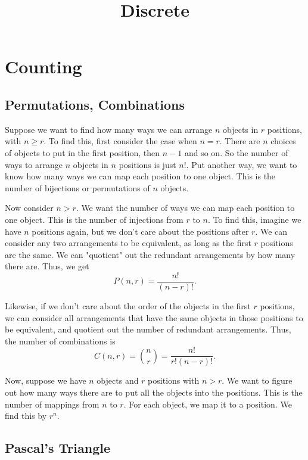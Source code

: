 \documentclass[../main.tex]{subfiles}
\title{Discrete}
\author{}
\date{}
\begin{document}
\maketitle
\tableofcontents

\newpage

\section{Counting}

\subsection{Permutations, Combinations}

Suppose we want to find how many ways we can arrange
\( n \) objects in \( r \) positions, with \( n \geq r \).
To find this, first consider the case when \( n = r \).
There are \( n \) choices of objects to put in the first position, then \( n - 1 \) and so on.
So the number of ways to arrange \( n \) objects in \( n \) positions is just \( n! \).
Put another way,
we want to know how many ways we can map each position to one object.
This is the number of bijections or permutations of \( n \) objects.

\noindent


Now consider \( n > r \).
We want the number of ways we can map each position to one object.
This is the number of injections from \( r \) to \( n \).
To find this, imagine we have \( n \) positions again,
but we don't care about the positions after \( r \).
We can consider any two arrangements to be equivalent,
as long as the first \( r \) positions are the same.
We can "quotient" out the redundant arrangements by how many there are.
Thus, we get
\[ P(n, r) = \frac{n!}{(n - r)!}. \]

Likewise,
if we don't care about the order of the objects in the first \( r \) positions,
we can consider all arrangements that have the same objects in those positions
to be equivalent,
and quotient out the number of redundant arrangements.
Thus, the number of combinations is
\[ C(n, r) = \binom{n}{r} = \frac{n!}{r! (n - r)!}. \]

Now, suppose we have \( n \) objects and \( r \) positions with \( n > r \).
We want to figure out how many ways there are to put all the objects into the positions.
This is the number of mappings from \( n \) to \( r \).
For each object, we map it to a position.
We find this by \( r^n \).

\subsection{Pascal's Triangle}
\end{document}
